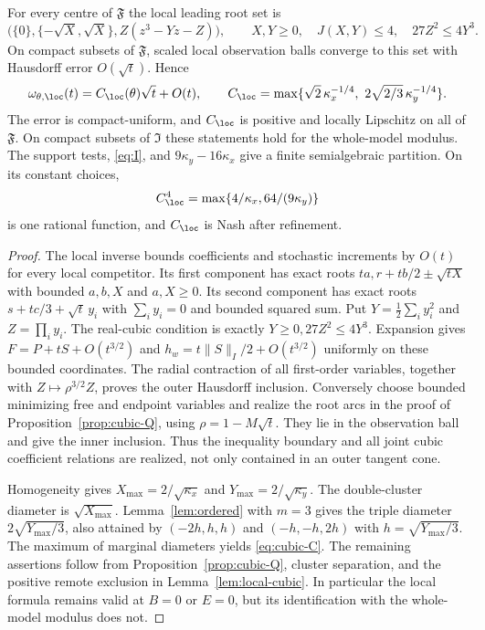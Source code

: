 \begin{theorem}\label{thm:cubic-local}
For every centre of $\mathfrak F$ the local leading root set is
\begin{equation}\label{eq:cubic-leading}
 \bigl(\{0\},\{-\sqrt X,\sqrt X\},Z(z^3-Yz-Z)\bigr),\qquad
 X,Y\ge0,\quad J(X,Y)\le4,\quad27Z^2\le4Y^3.
\end{equation}
On compact subsets of $\mathfrak F$, scaled local observation balls
converge to this set with Hausdorff error $O(\sqrt t)$. Hence
\begin{equation}\label{eq:cubic-C}
 \omega_{\theta,\loc}(t)=C_{\loc}(\theta)\sqrt t+O(t),\qquad
 C_{\loc}=\max\{\sqrt2\,\kappa_x^{-1/4},\ 2\sqrt{2/3}\,\kappa_y^{-1/4}\}.
\end{equation}
The error is compact-uniform, and $C_{\loc}$ is positive and locally
Lipschitz on all of $\mathfrak F$. On compact subsets of $\mathfrak I$
these statements hold for the whole-model modulus. The support tests,
\eqref{eq:I}, and $9\kappa_y-16\kappa_x$ give a finite semialgebraic
partition. On its constant choices,
\[
 C_{\loc}^4=\max\{4/\kappa_x,64/(9\kappa_y)\}
\]
is one rational function, and $C_{\loc}$ is Nash after refinement.
\end{theorem}
\begin{proof}
The local inverse bounds coefficients and stochastic increments by
$O(t)$ for every local competitor. Its first component has exact roots
$ta,r+tb/2\pm\sqrt{tX}$ with bounded $a,b,X$ and $a,X\ge0$.
Its second component has exact roots $s+tc/3+\sqrt t\,y_i$ with
$\sum_i y_i=0$ and bounded squared sum. Put
$Y=\tfrac12\sum_i y_i^2$ and $Z=\prod_i y_i$. The real-cubic condition
is exactly $Y\ge0,27Z^2\le4Y^3$. Expansion gives
$F=P+tS+O(t^{3/2})$ and $h_w=t\|S\|_I/2+O(t^{3/2})$ uniformly on
these bounded coordinates. The radial contraction of all first-order
variables, together with $Z\mapsto\rho^{3/2}Z$, proves the outer
Hausdorff inclusion. Conversely choose bounded minimizing free and
endpoint variables and realize the root arcs in the proof of
Proposition~\ref{prop:cubic-Q}, using $\rho=1-M\sqrt t$. They lie in
the observation ball and give the inner inclusion. Thus the inequality
boundary and all joint cubic coefficient relations are realized, not
only contained in an outer tangent cone.

Homogeneity gives $X_{\max}=2/\sqrt{\kappa_x}$ and
$Y_{\max}=2/\sqrt{\kappa_y}$. The double-cluster diameter is
$\sqrt{X_{\max}}$. Lemma~\ref{lem:ordered} with $m=3$ gives the triple
diameter $2\sqrt{Y_{\max}/3}$, also attained by
$(-2h,h,h)$ and $(-h,-h,2h)$ with $h=\sqrt{Y_{\max}/3}$.
The maximum of marginal diameters yields \eqref{eq:cubic-C}.
The remaining assertions follow from Proposition~\ref{prop:cubic-Q},
cluster separation, and the positive remote exclusion in
Lemma~\ref{lem:local-cubic}. In particular the local formula remains
valid at $B=0$ or $E=0$, but its identification with the whole-model
modulus does not.
\end{proof}

